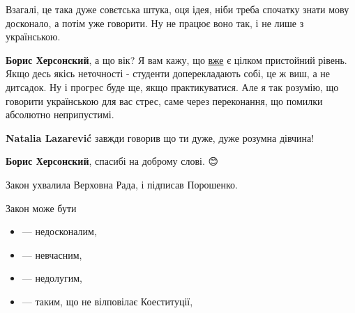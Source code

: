 \begin{itemize}
\begin{itemize}
 

Взагалі, це така дуже совєтська штука, оця ідея, ніби треба спочатку знати мову
досконало, а потім уже говорити. Ну не працює воно так, і не лише з
українською.

 
\textbf{Борис Херсонский}, а що вік? Я вам кажу, що \underline{вже} є цілком
пристойний рівень. Якщо десь якісь неточності - студенти доперекладають собі,
це ж виш, а не дитсадок. Ну і прогрес буде ще, якщо практикуватися. Але я так
розумію, що говорити українською для вас стрес, саме через переконання, що
помилки абсолютно неприпустимі.

 
\textbf{Natalia Lazarević} завжди говорив що ти дуже, дуже розумна дівчина!

 
\textbf{Борис Херсонский}, спасибі на доброму слові. 😊

\end{itemize}

 

Закон ухвалила Верховна Рада, і підписав Порошенко.

Закон може бути

\begin{itemize}
  \item — недосконалим,
  \item — невчасним,
  \item — недолугим,
  \item — таким, що не вілповілає Коеституції,
\end{itemize}


\end{itemize}
